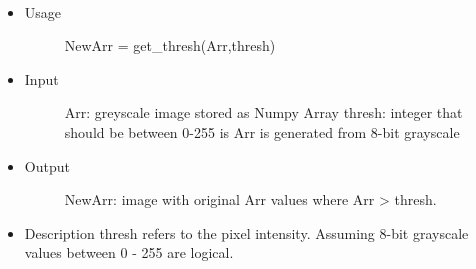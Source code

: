 \documentclass[letterpaper,10pt,oneside]{sphinxmanual}
\begin{document}
\begin{fulllineitems}
\label{index:libcelegans.get_thresh}~\begin{itemize}
\item {} \begin{description}
\item[{Usage}] \leavevmode
NewArr = get\_thresh(Arr,thresh)

\end{description}

\item {} \begin{description}
\item[{Input }] \leavevmode
Arr: greyscale image stored as Numpy Array
thresh: integer that should be between 0-255 is Arr is generated from 8-bit grayscale

\end{description}

\item {} \begin{description}
\item[{Output}] \leavevmode
NewArr: image with original Arr values where Arr \textgreater{} thresh.

\end{description}

\item {} 
Description
thresh refers to the pixel intensity.  Assuming 8-bit grayscale values between
0 - 255 are logical.

\end{itemize}

\end{fulllineitems}

\end{document}
